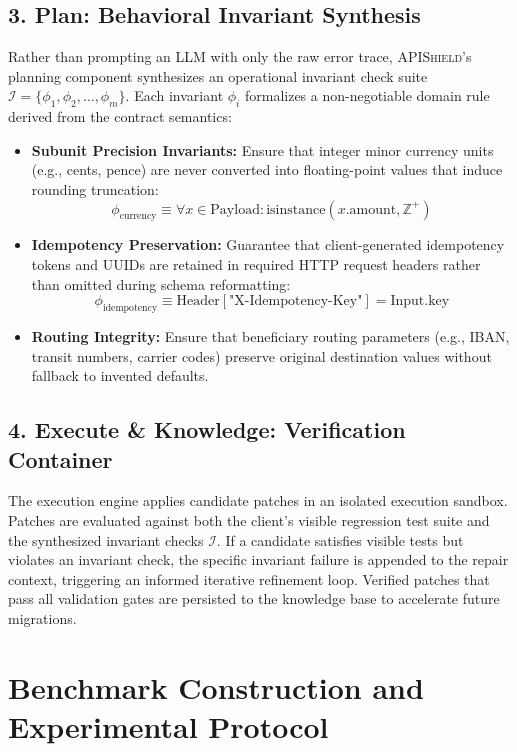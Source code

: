 \subsection{3. Plan: Behavioral Invariant Synthesis}
Rather than prompting an LLM with only the raw error trace, \textsc{APIShield}'s planning component synthesizes an operational invariant check suite $\mathcal{I} = \{\phi_1, \phi_2, \dots, \phi_m\}$. Each invariant $\phi_i$ formalizes a non-negotiable domain rule derived from the contract semantics:
\begin{itemize}
    \item \textbf{Subunit Precision Invariants:} Ensure that integer minor currency units (e.g., cents, pence) are never converted into floating-point values that induce rounding truncation:
    \[
    \phi_{\text{currency}} \equiv \forall x \in \text{Payload} : \text{isinstance}(x.\text{amount}, \mathbb{Z}^+)
    \]
    \item \textbf{Idempotency Preservation:} Guarantee that client-generated idempotency tokens and UUIDs are retained in required HTTP request headers rather than omitted during schema reformatting:
    \[
    \phi_{\text{idempotency}} \equiv \text{Header}[\text{"X-Idempotency-Key"}] = \text{Input}.\text{key}
    \]
    \item \textbf{Routing Integrity:} Ensure that beneficiary routing parameters (e.g., IBAN, transit numbers, carrier codes) preserve original destination values without fallback to invented defaults.
\end{itemize}

\subsection{4. Execute \& Knowledge: Verification Container}
The execution engine applies candidate patches in an isolated execution sandbox. Patches are evaluated against both the client's visible regression test suite and the synthesized invariant checks $\mathcal{I}$. If a candidate satisfies visible tests but violates an invariant check, the specific invariant failure is appended to the repair context, triggering an informed iterative refinement loop. Verified patches that pass all validation gates are persisted to the knowledge base to accelerate future migrations.

\section{Benchmark Construction and Experimental Protocol}
\label{sec:benchmark}

